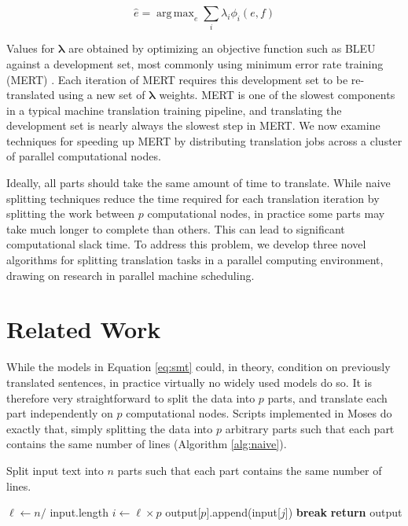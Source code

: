 \documentclass{pbml}
\DeclareMathOperator*{\argmax}{arg\,max}
\begin{document}
\begin{equation}
\hat{e} = \argmax_e \sum_i \lambda_i \phi_i(e,f)
\label{eq:smt}
\end{equation}


Values for $\bm{\lambda}$ are obtained by optimizing an objective function such as BLEU \citep{papinenietal01} against a development set, most commonly using minimum error rate training (MERT) \citep{och03}. Each iteration of MERT requires this development set to be re-translated using a new set of $\bm{\lambda}$ weights. MERT is one of the slowest components in a typical machine translation training pipeline, and translating the development set is nearly always the slowest step in MERT. We now examine techniques for speeding up MERT by distributing translation jobs across a cluster of parallel computational nodes. 

Ideally, all parts should take the same amount of time to translate. While naive splitting techniques reduce the time required for each translation iteration by splitting the work between $p$ computational nodes, in practice some parts may take much longer to complete than others. This can lead to significant computational slack time.
%
To address this problem, we develop three novel algorithms for splitting translation tasks in a parallel computing environment, drawing on research in parallel machine scheduling.





\section{Related Work}

While the models in Equation \ref{eq:smt} could, in theory, condition on previously translated sentences, in practice virtually no widely used models do so. It is therefore very straightforward to split the data into $p$ parts, and translate each part independently on $p$ computational nodes. Scripts implemented in Moses \citep{moses} do exactly that, simply splitting the data into $p$ arbitrary parts such that each part contains the same number of lines (Algorithm \ref{alg:naive}).

\begin{algorithm}
\caption{Split input text into $n$ parts such that each part contains the same number of lines.}
\begin{algorithmic}
\State $\ell \gets n / $ input.length
\State $i \gets \ell \times p$
\State output[$p$].append(input[$j$])
\Else
\State \textbf{break}
\EndIf
\EndFor
\EndFor
\State \textbf{return} output
\EndFunction
\end{algorithmic}
\label{alg:naive}
\end{algorithm}
\end{document}
